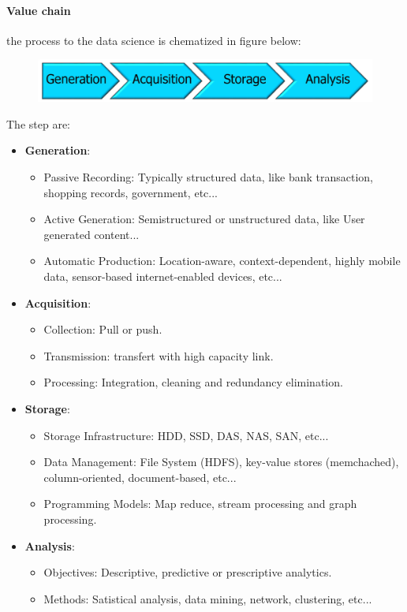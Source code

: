 \documentclass[12pt]{article}
\begin{document}
\paragraph{Value chain} the process to the data science is chematized in figure below:
\begin{figure}[H]
  \includegraphics[width=\linewidth]{images/chain.png}
  \label{fig:chain}
\end{figure}
\noindent The step are:
\begin{itemize}
  \item \textbf{Generation}:
  \begin{itemize}
    \item Passive Recording: Typically structured data, like bank transaction, shopping records, government, etc...
    \item Active Generation: Semistructured or unstructured data, like User generated content...
    \item Automatic Production: Location-aware, context-dependent, highly mobile data, sensor-based internet-enabled devices, etc...
  \end{itemize}
  \item \textbf{Acquisition}:
  \begin{itemize}
    \item Collection: Pull or push.
    \item Transmission: transfert with high capacity link.
    \item Processing: Integration, cleaning  and redundancy elimination.
  \end{itemize}
  \item \textbf{Storage}:
  \begin{itemize}
    \item Storage Infrastructure: HDD, SSD, DAS, NAS, SAN, etc...
    \item Data Management: File System (HDFS), key-value stores (memchached), column-oriented, document-based, etc...
    \item Programming Models: Map reduce, stream processing and graph processing.
  \end{itemize}
  \item \textbf{Analysis}:
  \begin{itemize}
    \item Objectives: Descriptive, predictive or prescriptive analytics.
    \item Methods: Satistical analysis, data mining, network, clustering, etc...
  \end{itemize}
\end{itemize}
\end{document}
